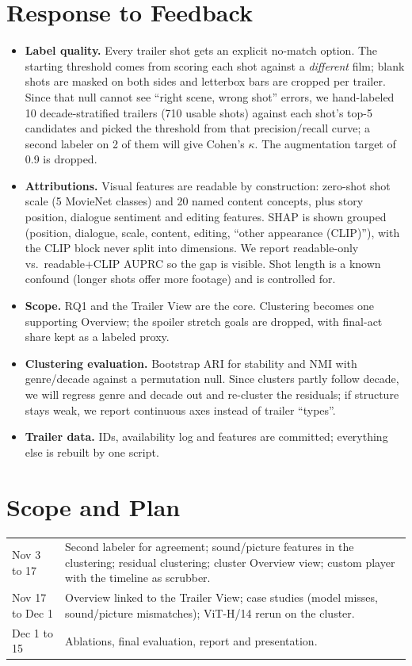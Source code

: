 \documentclass[10pt]{article}
\begin{document}
\section{Response to Feedback}
\begin{itemize}
\item \textbf{Label quality.} Every trailer shot gets an explicit no-match option. The starting threshold comes from scoring each shot against a \emph{different} film; blank shots are masked on both sides and letterbox bars are cropped per trailer. Since that null cannot see ``right scene, wrong shot'' errors, we hand-labeled 10 decade-stratified trailers (710 usable shots) against each shot's top-5 candidates and picked the threshold from that precision/recall curve; a second labeler on 2 of them will give Cohen's $\kappa$. The augmentation target of 0.9 is dropped.
\item \textbf{Attributions.} Visual features are readable by construction: zero-shot shot scale (5 MovieNet classes) and 20 named content concepts, plus story position, dialogue sentiment and editing features. SHAP is shown grouped (position, dialogue, scale, content, editing, ``other appearance (CLIP)''), with the CLIP block never split into dimensions. We report readable-only vs.\ readable+CLIP AUPRC so the gap is visible. Shot length is a known confound (longer shots offer more footage) and is controlled for.
\item \textbf{Scope.} RQ1 and the Trailer View are the core. Clustering becomes one supporting Overview; the spoiler stretch goals are dropped, with final-act share kept as a labeled proxy.
\item \textbf{Clustering evaluation.} Bootstrap ARI for stability and NMI with genre/decade against a permutation null. Since clusters partly follow decade, we will regress genre and decade out and re-cluster the residuals; if structure stays weak, we report continuous axes instead of trailer ``types''.
\item \textbf{Trailer data.} IDs, availability log and features are committed; everything else is rebuilt by one script.
\end{itemize}

\section{Scope and Plan}
\begin{tabularx}{\linewidth}{@{}lX@{}}
Nov 3 to 17 & Second labeler for agreement; sound/picture features in the clustering; residual clustering; cluster Overview view; custom player with the timeline as scrubber. \\
Nov 17 to Dec 1 & Overview linked to the Trailer View; case studies (model misses, sound/picture mismatches); ViT-H/14 rerun on the cluster. \\
Dec 1 to 15 & Ablations, final evaluation, report and presentation.
\end{tabularx}
\end{document}
